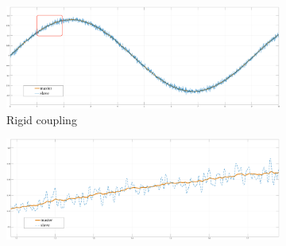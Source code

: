 \begin{figure}
	\begin{subfigure}[h!]{1\linewidth}
		\centering
		\includegraphics[width=\textwidth, height=\textwidth/4]{Images/rCoupFreeTot50htznoiseRect}
		\caption{Rigid coupling}
		\label{fig:freeRigTot50HR}
	\end{subfigure}	
  \newline
	\begin{subfigure}[h!]{1\linewidth}
		\centering
		\includegraphics[width=\textwidth, height=\textwidth/4]{Images/rCoupFree50htznoise}

\end{subfigure}
\end{figure}
